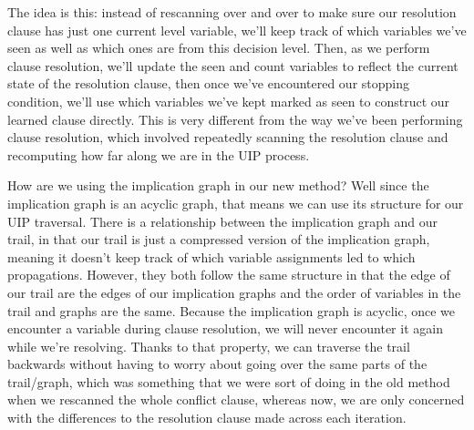 \documentclass[../main.tex]{subfiles}
\begin{document}
The idea is this: instead of rescanning over and over to make sure our resolution clause
has just one current level variable, we'll keep track of which variables we've seen as 
well as which ones are from this decision level. Then, as we perform clause resolution, 
we'll update the seen and count variables to reflect the current state of the resolution 
clause, then once we've encountered our stopping condition, we'll use which variables 
we've kept marked as seen to construct our learned clause directly. This is very different 
from the way we've been performing clause resolution, which involved repeatedly scanning the 
resolution clause and recomputing how far along we are in the UIP process. 

How are we using the implication graph in our new method? Well since the implication 
graph is an acyclic graph, that means we can use its structure for our UIP traversal. 
There is a relationship between the implication graph and our trail, in that our trail 
is just a compressed version of the implication graph, meaning it doesn't keep track of 
which variable assignments led to which propagations. However, they both follow the same 
structure in that the edge of our trail are the edges of our implication graphs and the 
order of variables in the trail and graphs are the same. Because the implication graph 
is acyclic, once we encounter a variable during clause resolution, we will never encounter 
it again while we're resolving. Thanks to that property, we can traverse the trail backwards 
without having to worry about going over the same parts of the trail/graph, which was 
something that we were sort of doing in the old method when we rescanned the whole 
conflict clause, whereas now, we are only concerned with the differences to the resolution
clause made across each iteration. 
\end{document}
